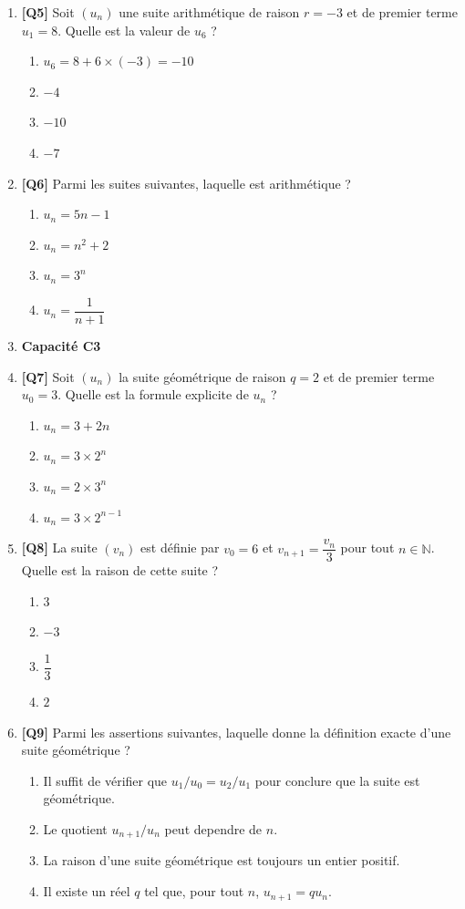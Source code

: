 \begin{enumerate}
\item \textbf{[Q5]} Soit $(u_n)$ une suite arithmétique de raison $r = -3$ et de premier terme $u_1 = 8$. Quelle est la valeur de $u_6$ ?
  \begin{enumerate}[label=\Alph*.]
    \item $u_6 = 8 + 6 \times (-3) = -10$
    \item $-4$
    \item $-10$
    \item $-7$
  \end{enumerate}

\item \textbf{[Q6]} Parmi les suites suivantes, laquelle est arithmétique ?
  \begin{enumerate}[label=\Alph*.]
    \item $u_n = 5n - 1$
    \item $u_n = n^2 + 2$
    \item $u_n = 3^n$
    \item $u_n = \dfrac{1}{n+1}$
  \end{enumerate}

\item[] \textbf{Capacité C3}

\item \textbf{[Q7]} Soit $(u_n)$ la suite géométrique de raison $q = 2$ et de premier terme $u_0 = 3$. Quelle est la formule explicite de $u_n$ ?
  \begin{enumerate}[label=\Alph*.]
    \item $u_n = 3 + 2n$
    \item $u_n = 3 \times 2^n$
    \item $u_n = 2 \times 3^n$
    \item $u_n = 3 \times 2^{n-1}$
  \end{enumerate}

\item \textbf{[Q8]} La suite $(v_n)$ est définie par $v_0 = 6$ et $v_{n+1} = \dfrac{v_n}{3}$ pour tout $n \in \mathbb{N}$. Quelle est la raison de cette suite ?
  \begin{enumerate}[label=\Alph*.]
    \item $3$
    \item $-3$
    \item $\dfrac{1}{3}$
    \item $2$
  \end{enumerate}

\item \textbf{[Q9]} Parmi les assertions suivantes, laquelle donne la définition exacte d'une suite géométrique ?
  \begin{enumerate}[label=\Alph*.]
    \item Il suffit de vérifier que $u_1/u_0 = u_2/u_1$ pour conclure que la suite est géométrique.
    \item Le quotient $u_{n+1}/u_n$ peut dependre de $n$.
    \item La raison d'une suite géométrique est toujours un entier positif.
    \item Il existe un réel $q$ tel que, pour tout $n$, $u_{n+1}=q u_n$.
  \end{enumerate}


\end{enumerate}
